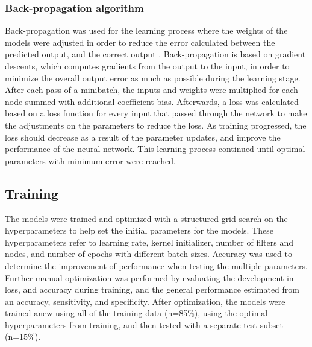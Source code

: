 \subsubsection*{\textbf{Back-propagation algorithm}}
Back-propagation was used for the learning process where the weights of the models were adjusted in order to reduce the error calculated between the predicted output, and the correct output \citep{Duda2000}. Back-propagation is based on gradient descents, which computes gradients from the output to the input, in order to minimize the overall output error as much as possible during the learning stage. 
After each pass of a minibatch, the inputs and weights were multiplied for each node summed with additional coefficient bias.\citep{LeCun1998, Hameed2016}
Afterwards, a loss was calculated based on a loss function for every input that passed through the network to make the adjustments on the parameters to reduce the loss. As training progressed, the loss should decrease as a result of the parameter updates, and improve the performance of the neural network.\citep{Goodfellow2016, LeCun2015, Duda2000} This learning process continued until optimal parameters with minimum error were reached.\citep{Hameed2016}

\subsection*{\textbf{Training}}
The models were trained and optimized with a structured grid search on the hyperparameters to help set the initial parameters for the models. These hyperparameters refer to learning rate, kernel initializer, number of filters and nodes, and number of epochs with different batch sizes. Accuracy was used to determine the improvement of performance when testing the multiple parameters.
Further manual optimization was performed by evaluating the development in loss, and accuracy during training, and the general performance estimated from an accuracy, sensitivity, and specificity. After optimization, the models were trained anew using all of the training data (n=85\%), using the optimal hyperparameters from training, and then tested with a separate test subset (n=15\%).
 




